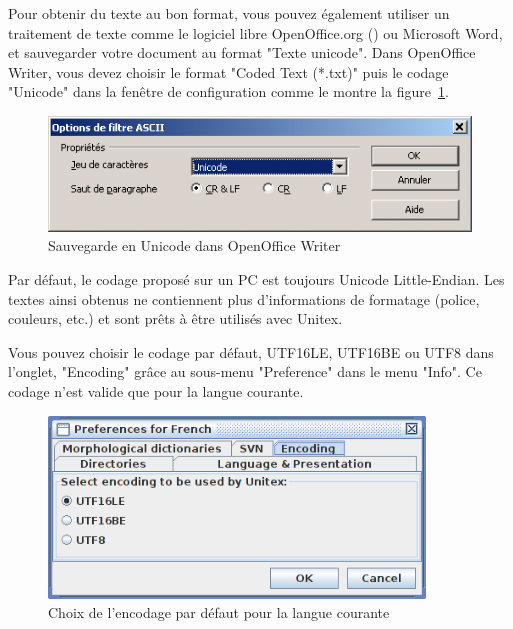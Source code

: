 \noindent Pour obtenir du texte au bon format, vous pouvez également utiliser un traitement de
texte comme le logiciel libre OpenOffice.org (\cite{OpenOffice}) ou Microsoft Word, et sauvegarder
votre document au format "Texte unicode". Dans OpenOffice Writer, vous devez choisir le format
"Coded Text (*.txt)" puis le codage "Unicode" dans la fenêtre de configuration comme le montre la
figure~\ref{OfficeWriter}.

\begin{figure}[!h]
\begin{center}
\includegraphics[width=12.5cm]{resources/img/fig2-4.png}
\caption{\label{OfficeWriter}Sauvegarde en Unicode dans OpenOffice Writer}
\end{center}
\end{figure}

\noindent Par défaut, le codage proposé sur un PC est toujours Unicode Little-Endian. Les textes 
ainsi obtenus ne contiennent plus d’informations de formatage (police, couleurs, etc.) et sont
prêts à être utilisés avec Unitex.

\bigskip
\noindent 
Vous pouvez choisir le codage par défaut, UTF16LE, UTF16BE ou UTF8 dans l'onglet, "Encoding" grâce
au sous-menu "Preference"  dans le menu "Info". Ce codage n'est valide que pour la langue
courante.

\begin{figure}[!h]
\begin{center}
\includegraphics[width=10cm]{resources/img/fig2-5.png}
\caption{Choix de l'encodage par défaut pour la langue courante}
\end{center}
\end{figure}

